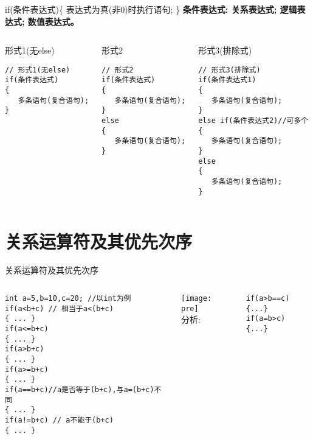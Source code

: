\begin{frame}{if(条件表达式)\{ 表达式为真(非0)时执行语句; \}}
\textbf{条件表达式: 关系表达式; 逻辑表达式; 数值表达式。}
\begin{columns}[t]
\begin{beamerboxesrounded}{形式1(无else)}
\begin{lstlisting}
// 形式1(无else)
if(条件表达式)
{
   多条语句(复合语句);
}
\end{lstlisting}
\end{beamerboxesrounded}
\begin{beamerboxesrounded}{形式2}
\begin{lstlisting}
// 形式2
if(条件表达式)
{
   多条语句(复合语句);
}
else
{
   多条语句(复合语句);
}
\end{lstlisting} 
\end{beamerboxesrounded}
\begin{beamerboxesrounded}{形式3(排除式)}
\begin{lstlisting}
// 形式3(排除式)
if(条件表达式1)
{
   多条语句(复合语句);
}
else if(条件表达式2)//可多个
{
   多条语句(复合语句);
}
else
{
   多条语句(复合语句);
}
\end{lstlisting}
\end{beamerboxesrounded}
\end{columns}                        
\end{frame}

\section{关系运算符及其优先次序}

\begin{frame}{关系运算符及其优先次序}
\begin{columns}%
\begin{lstlisting}
int a=5,b=10,c=20; //以int为例
if(a<b+c) // 相当于a<(b+c)
{ ... }
if(a<=b+c) 
{ ... }
if(a>b+c) 
{ ... }
if(a>=b+c) 
{ ... }
if(a==b+c)//a是否等于(b+c),与a=(b+c)不同
{ ... }
if(a!=b+c) // a不能于(b+c)
{ ... }
\end{lstlisting}
\texttt{[image: pre]}\\
分析:
\begin{lstlisting}
if(a>b==c){...}
if(a=b>c) {...}
\end{lstlisting}
\end{columns}
\end{frame}

